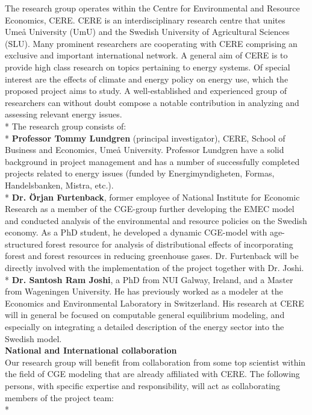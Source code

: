 The research group operates within the Centre for Environmental and Resource Economics, CERE. CERE is an interdisciplinary research centre that unites Umeå University (UmU) and the Swedish University of Agricultural Sciences (SLU). Many prominent researchers are cooperating with CERE comprising an exclusive and important international network. A general aim of CERE is to provide high class research on topics pertaining to energy systems. Of special interest are the effects of climate and energy policy on energy use, which the proposed project aims to study. A well-established and experienced group of researchers can without doubt compose a notable contribution in analyzing and assessing relevant energy issues.\\*
The research group consists of:\\*
\textbf{Professor Tommy Lundgren} (principal investigator), CERE, School of Business and Economics, Umeå University. Professor Lundgren have a solid background in project management and has a number of successfully completed projects related to energy issues (funded by Energimyndigheten, Formas, Handelsbanken, Mistra, etc.).\\*
\textbf{Dr. Örjan Furtenback}, former employee of National Institute for Economic Research as a member of the CGE-group further developing the EMEC model and conducted analysis of the environmental and resource policies on the Swedish economy. As a PhD student, he developed a dynamic CGE-model with age-structured forest resource for analysis of distributional effects of incorporating forest and forest resources in reducing greenhouse gases. Dr. Furtenback will be directly involved with the implementation of the project together with Dr. Joshi.\\*
\textbf{Dr. Santosh Ram Joshi}, a PhD from NUI Galway, Ireland, and a Master from Wageningen University. He has previously worked as a modeler at the Economics and Environmental Laboratory in Switzerland. His research at CERE will in general be focused on computable general equilibrium modeling, and especially on integrating a detailed description of the energy sector into the Swedish model.\\
\textbf{National and International collaboration}\\
Our research group will benefit from collaboration from some top scientist within the field of CGE modeling that are already affiliated with CERE. The following persons, with specific expertise and responsibility, will act as collaborating members of the project team:\\*
